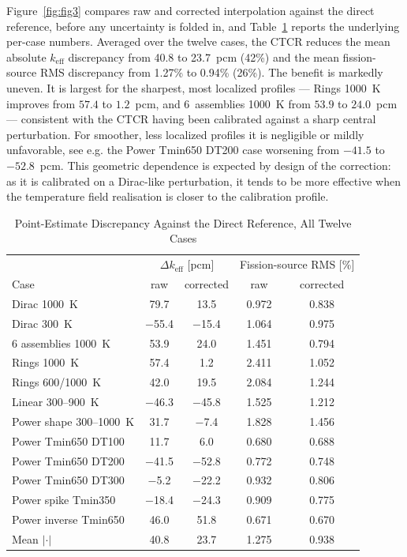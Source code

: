 \documentclass{style/nseJournal}
\begin{document}
Figure~\ref{fig:fig3} compares raw and corrected interpolation against the direct reference, before any uncertainty is folded in, and Table~\ref{tab:reference_results} reports the underlying per-case numbers. Averaged over the twelve cases, the CTCR reduces the mean absolute $k_{\text{eff}}$ discrepancy from 40.8 to 23.7~pcm (42\%) and the mean fission-source RMS discrepancy from 1.27\% to 0.94\% (26\%). The benefit is markedly uneven. It is largest for the sharpest, most localized profiles --- Rings 1000~K improves from $57.4$ to $1.2$~pcm, and 6~assemblies 1000~K from $53.9$ to $24.0$~pcm --- consistent with the CTCR having been calibrated against a sharp central perturbation. For smoother, less localized profiles it is negligible or mildly unfavorable, see e.g. the Power Tmin650 DT200 case worsening from $-41.5$ to $-52.8$~pcm. This geometric dependence is expected by design of the correction: as it is calibrated on a Dirac-like perturbation, it tends to be more effective when the temperature field realisation is closer to the calibration profile.

\begin{table}[h]
\centering
\caption{Point-Estimate Discrepancy Against the Direct Reference, All Twelve Cases}
\label{tab:reference_results}
\begin{tabular}{lcccc}
\hline
 & \multicolumn{2}{c}{$\Delta k_{\text{eff}}$ [pcm]} & \multicolumn{2}{c}{Fission-source RMS [\%]} \\
Case & raw & corrected & raw & corrected \\ \hline
Dirac 1000~K            & 79.7  & 13.5  & 0.972 & 0.838 \\
Dirac 300~K              & $-$55.4 & $-$15.4 & 1.064 & 0.975 \\
6 assemblies 1000~K      & 53.9  & 24.0  & 1.451 & 0.794 \\
Rings 1000~K             & 57.4  & 1.2   & 2.411 & 1.052 \\
Rings 600/1000~K         & 42.0  & 19.5  & 2.084 & 1.244 \\
Linear 300--900~K        & $-$46.3 & $-$45.8 & 1.525 & 1.212 \\
Power shape 300--1000~K  & 31.7  & $-$7.4  & 1.828 & 1.456 \\
Power Tmin650 DT100      & 11.7  & 6.0   & 0.680 & 0.688 \\
Power Tmin650 DT200      & $-$41.5 & $-$52.8 & 0.772 & 0.748 \\
Power Tmin650 DT300      & $-$5.2  & $-$22.2 & 0.932 & 0.806 \\
Power spike Tmin350      & $-$18.4 & $-$24.3 & 0.909 & 0.775 \\
Power inverse Tmin650    & 46.0  & 51.8  & 0.671 & 0.670 \\ \hline
Mean $|\cdot|$           & 40.8  & 23.7  & 1.275 & 0.938 \\ \hline
\end{tabular}
\end{table}
\end{document}
